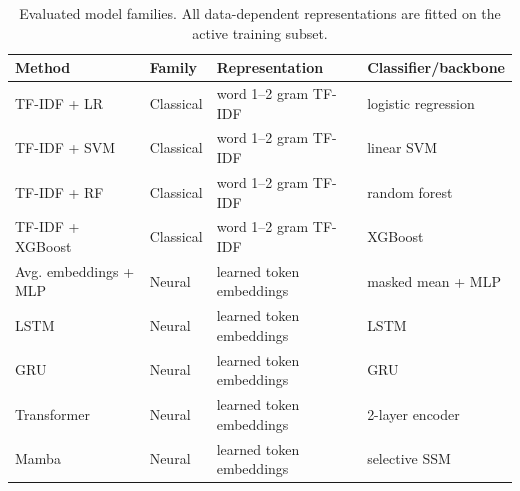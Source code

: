 \begin{table}[t]
\centering
\caption{Evaluated model families. All data-dependent representations are fitted on the active training subset.}
\label{tab:models}
\small
\begin{tabular}{llll}
\toprule
Method & Family & Representation & Classifier/backbone \\
\midrule
TF-IDF + LR & Classical & word 1--2 gram TF-IDF & logistic regression \\
TF-IDF + SVM & Classical & word 1--2 gram TF-IDF & linear SVM \\
TF-IDF + RF & Classical & word 1--2 gram TF-IDF & random forest \\
TF-IDF + XGBoost & Classical & word 1--2 gram TF-IDF & XGBoost \\
Avg. embeddings + MLP & Neural & learned token embeddings & masked mean + MLP \\
LSTM & Neural & learned token embeddings & LSTM \\
GRU & Neural & learned token embeddings & GRU \\
Transformer & Neural & learned token embeddings & 2-layer encoder \\
Mamba & Neural & learned token embeddings & selective SSM \\
\bottomrule
\end{tabular}
\end{table}
